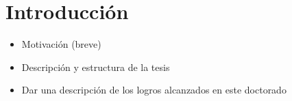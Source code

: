 \chapter{Introducci\'on}



\begin{itemize}
	\item Motivaci\'on (breve)
	\item Descripci\'on y estructura de la tesis
	\item Dar una descripci\'on de los logros alcanzados en este doctorado
\end{itemize}